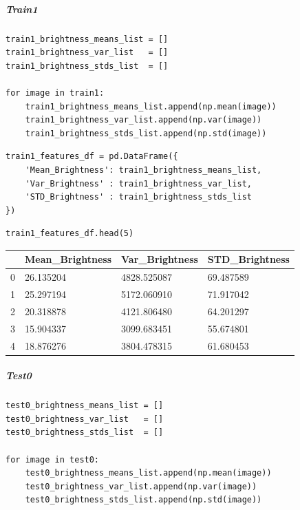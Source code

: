 \bigskip

\subparagraph{Train1}

\begin{verbatim}
train1_brightness_means_list = []
train1_brightness_var_list   = []
train1_brightness_stds_list  = []

for image in train1:
    train1_brightness_means_list.append(np.mean(image))
    train1_brightness_var_list.append(np.var(image))
    train1_brightness_stds_list.append(np.std(image))
\end{verbatim}

\begin{verbatim}
train1_features_df = pd.DataFrame({
    'Mean_Brightness': train1_brightness_means_list,
    'Var_Brightness' : train1_brightness_var_list,
    'STD_Brightness' : train1_brightness_stds_list
})
\end{verbatim}

\begin{verbatim}
train1_features_df.head(5)
\end{verbatim}

\bigskip\noindent
\begin{tabular}{p{}p{}p{}p{}}
\toprule
 & Mean\_Brightness & Var\_Brightness & STD\_Brightness \\
\hline
0 & 26.135204 & 4828.525087 & 69.487589 \\
\hline
1 & 25.297194 & 5172.060910 & 71.917042 \\
\hline
2 & 20.318878 & 4121.806480 & 64.201297 \\
\hline
3 & 15.904337 & 3099.683451 & 55.674801 \\
\hline
4 & 18.876276 & 3804.478315 & 61.680453 \\
\hline
\bottomrule
\end{tabular}

\bigskip

\subparagraph{Test0}

\begin{verbatim}
test0_brightness_means_list = []
test0_brightness_var_list   = []
test0_brightness_stds_list  = []

for image in test0:
    test0_brightness_means_list.append(np.mean(image))
    test0_brightness_var_list.append(np.var(image))
    test0_brightness_stds_list.append(np.std(image))
\end{verbatim}

